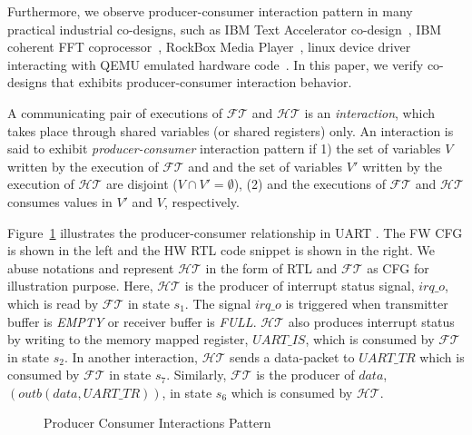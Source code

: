 \documentclass[sigconf]{acmart}
\begin{document}
Furthermore, we observe producer-consumer interaction pattern 
in many practical industrial co-designs, such as IBM 
Text Accelerator co-design~\cite{polig2014micro,polig2014fpl}, 
IBM coherent FFT coprocessor~\cite{giefers2015accelerating}, RockBox 
Media Player~\cite{hvc}, linux device driver interacting with QEMU emulated
hardware code~\cite{codes14}. In this paper, we verify co-designs that 
exhibits producer-consumer interaction behavior. 


%
A communicating pair of executions of 
$\mathcal{FT}$ and $\mathcal{HT}$ is an {\em interaction}, which 
takes place through shared variables (or shared registers)
only.  An interaction is said to exhibit {\em producer-consumer}
interaction pattern if 1) the set of variables $V$ written by 
the execution of $\mathcal{FT}$ and and the set of variables 
$V'$ written by the execution of $\mathcal{HT}$ are disjoint 
($V \cap V' = \emptyset$), (2) and the executions 
of $\mathcal{FT}$ and $\mathcal{HT}$ consumes values 
in $V'$ and $V$, respectively.
%


Figure~\ref{fig:interleaving1} illustrates the producer-consumer relationship 
in UART . The FW CFG is shown in the left and the HW RTL code snippet 
is shown in the right. We abuse notations and 
represent $\mathcal{HT}$ in the form of RTL and $\mathcal{FT}$ as CFG
for illustration purpose. Here, $\mathcal{HT}$ is the producer of interrupt 
status signal, $irq\_o$, which is read by $\mathcal{FT}$ in state $s_1$. 
The signal $irq\_o$ is  triggered when transmitter buffer is 
{\em EMPTY} or receiver buffer is {\em FULL}. 
$\mathcal{HT}$ also produces interrupt status by writing to the 
memory mapped register, $UART\_IS$, which is consumed by 
$\mathcal{FT}$ in state $s_2$.  In another interaction, $\mathcal{HT}$
sends a data-packet to $UART\_TR$ which is consumed by $\mathcal{FT}$ in state $s_7$.
Similarly, $\mathcal{FT}$ is the producer of $data$, $(outb(data,UART\_TR))$, 
in state $s_6$ which is consumed by $\mathcal{HT}$.  
%
\begin{figure}[t]
\caption{Producer Consumer Interactions Pattern
\label{fig:interleaving1}}
\end{figure}
%
\end{document}
